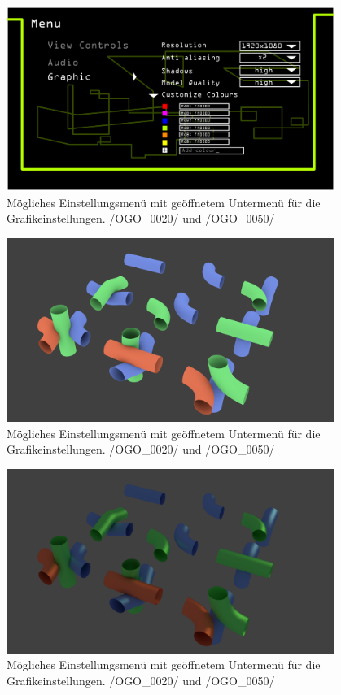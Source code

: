 	\begin{figure}[ht]
	  \centering
	  \includegraphics[width = 0.95\textwidth]{Inhalt/Nutzung/Grafiken/Grafische_Oberflaechen/08_Knot3-menu-graphics.png}
	  \caption{Mögliches Einstellungsmenü mit geöffnetem Untermenü für die Grafikeinstellungen. /OGO\_0020/ und /OGO\_0050/}
	  \label{fig:setGFX}
	\end{figure}
	
	\begin{figure}[ht]
	  \centering
	  \includegraphics[width = 0.95\textwidth]{Inhalt/Nutzung/Grafiken/Grafische_Oberflaechen/Pipes1.png}
	  \caption{Mögliches Einstellungsmenü mit geöffnetem Untermenü für die Grafikeinstellungen. /OGO\_0020/ und /OGO\_0050/}
	  \label{fig:pipes1}
	\end{figure}
	
\begin{figure}[ht]
	  \centering
	  \includegraphics[width = 0.95\textwidth]{Inhalt/Nutzung/Grafiken/Grafische_Oberflaechen/Pipes2.png}
	  \caption{Mögliches Einstellungsmenü mit geöffnetem Untermenü für die Grafikeinstellungen. /OGO\_0020/ und /OGO\_0050/}
	  \label{fig:pipes2}
	\end{figure}
	
	

